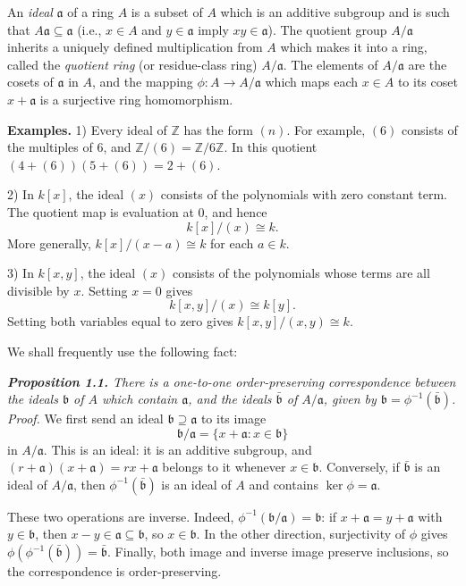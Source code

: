 An \emph{ideal} $\mathfrak a$ of a ring $A$ is a subset of $A$ which is an additive subgroup and is such
that $A\mathfrak a\subseteq\mathfrak a$ (i.e., $x\in A$ and $y\in\mathfrak a$ imply $xy\in\mathfrak a$).  The quotient group $A/\mathfrak a$
inherits a uniquely defined multiplication from $A$ which makes it into a ring,
called the \emph{quotient ring} (or residue-class ring) $A/\mathfrak a$.  The elements of $A/\mathfrak a$ are the
cosets of $\mathfrak a$ in $A$, and the mapping $\phi:A\longrightarrow A/\mathfrak a$ which maps each $x\in A$ to its
coset $x+\mathfrak a$ is a surjective ring homomorphism.

\textline
\noindent\textbf{Examples.} 1) Every ideal of $\mathbb Z$ has the form $(n)$.
For example, $(6)$ consists of the multiples of $6$, and
$\mathbb Z/(6)=\mathbb Z/6\mathbb Z$.  In this quotient
$(4+(6))(5+(6))=2+(6)$.

2) In $k[x]$, the ideal $(x)$ consists of the polynomials with zero constant
term.  The quotient map is evaluation at $0$, and hence
\[
k[x]/(x)\cong k.
\]
More generally, $k[x]/(x-a)\cong k$ for each $a\in k$.

3) In $k[x,y]$, the ideal $(x)$ consists of the polynomials whose terms are all
divisible by $x$.  Setting $x=0$ gives
\[
k[x,y]/(x)\cong k[y].
\]
Setting both variables equal to zero gives $k[x,y]/(x,y)\cong k$.
\textline

We shall frequently use the following fact:

\medskip
\noindent\textit{\textbf{Proposition 1.1.} There is a one-to-one order-preserving correspondence
between the ideals $\mathfrak b$ of $A$ which contain $\mathfrak a$, and the ideals $\bar{\mathfrak b}$ of $A/\mathfrak a$, given by
$\mathfrak b=\phi^{-1}(\bar{\mathfrak b})$.}
\textline
\noindent\emph{Proof.} We first send an ideal $\mathfrak b\supseteq\mathfrak a$
to its image
\[
\mathfrak b/\mathfrak a=\{x+\mathfrak a:x\in\mathfrak b\}
\]
in $A/\mathfrak a$.  This is an ideal: it is an additive subgroup, and
$(r+\mathfrak a)(x+\mathfrak a)=rx+\mathfrak a$ belongs to it whenever
$x\in\mathfrak b$.  Conversely, if $\bar{\mathfrak b}$ is an ideal of
$A/\mathfrak a$, then $\phi^{-1}(\bar{\mathfrak b})$ is an ideal of $A$ and
contains $\ker\phi=\mathfrak a$.

These two operations are inverse.  Indeed,
$\phi^{-1}(\mathfrak b/\mathfrak a)=\mathfrak b$: if
$x+\mathfrak a=y+\mathfrak a$ with $y\in\mathfrak b$, then
$x-y\in\mathfrak a\subseteq\mathfrak b$, so $x\in\mathfrak b$.  In the other
direction, surjectivity of $\phi$ gives
$\phi(\phi^{-1}(\bar{\mathfrak b}))=\bar{\mathfrak b}$.  Finally, both image and
inverse image preserve inclusions, so the correspondence is order-preserving.\proofbox
\textline
\medskip

